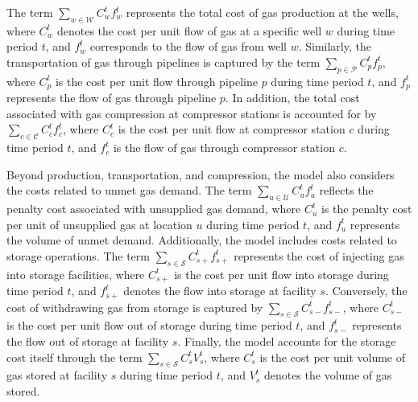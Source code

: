 The term $\sum_{w \in \mathcal{W}} C_{w}^t {f_{w}^t}$ represents the total cost of gas production at the wells, where $C_{w}^t$ denotes the cost per unit flow of gas at a specific well $w$ during time period $t$, and $f_{w}^t$ corresponds to the flow of gas from well $w$. Similarly, the transportation of gas through pipelines is captured by the term $\sum_{p \in \mathcal{P}} C_{p}^t {f_{p}^t}$, where $C_{p}^t$ is the cost per unit flow through pipeline $p$ during time period $t$, and $f_{p}^t$ represents the flow of gas through pipeline $p$. In addition, the total cost associated with gas compression at compressor stations is accounted for by $\sum_{c \in \mathcal{C}} C_{c}^t {f_{c}^t}$, where $C_{c}^t$ is the cost per unit flow at compressor station $c$ during time period $t$, and $f_{c}^t$ is the flow of gas through compressor station $c$.

Beyond production, transportation, and compression, the model also considers the costs related to unmet gas demand. The term $\sum_{u \in \mathcal{U}} C_{u}^{t} {f_{u}^{t}}$ reflects the penalty cost associated with unsupplied gas demand, where $C_{u}^{t}$ is the penalty cost per unit of unsupplied gas at location $u$ during time period $t$, and $f_{u}^{t}$ represents the volume of unmet demand. Additionally, the model includes costs related to storage operations. The term $\sum_{s \in \mathcal{S}} C_{s+}^{t} {f_{s+}^{t}}$ represents the cost of injecting gas into storage facilities, where $C_{s+}^{t}$ is the cost per unit flow into storage during time period $t$, and $f_{s+}^{t}$ denotes the flow into storage at facility $s$. Conversely, the cost of withdrawing gas from storage is captured by $\sum_{s \in \mathcal{S}} C_{s-}^{t} {f_{s-}^{t}}$, where $C_{s-}^{t}$ is the cost per unit flow out of storage during time period $t$, and $f_{s-}^{t}$ represents the flow out of storage at facility $s$. Finally, the model accounts for the storage cost itself through the term $\sum_{s \in \mathcal{S}} C_{s}^{t} {V_{s}^{t}}$, where $C_{s}^{t}$ is the cost per unit volume of gas stored at facility $s$ during time period $t$, and $V_{s}^{t}$ denotes the volume of gas stored. 


